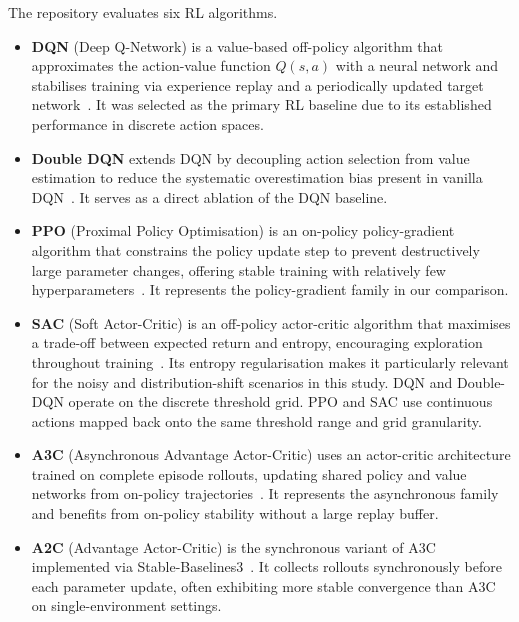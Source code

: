 \documentclass[12pt,a4paper]{article}
\begin{document}
The repository evaluates six RL algorithms.
\begin{itemize}[leftmargin=*]
    \item \textbf{DQN} (Deep Q-Network) is a value-based off-policy algorithm that
          approximates the action-value function $Q(s, a)$ with a neural network and
          stabilises training via experience replay and a periodically updated target
          network~\cite{mnih2015dqn}. It was selected as the primary RL baseline due
          to its established performance in discrete action spaces.

    \item \textbf{Double DQN} extends DQN by decoupling action selection from value
          estimation to reduce the systematic overestimation bias present in vanilla
          DQN~\cite{van2016ddqn}. It serves as a direct ablation of the DQN baseline.

    \item \textbf{PPO} (Proximal Policy Optimisation) is an on-policy policy-gradient
          algorithm that constrains the policy update step to prevent destructively
          large parameter changes, offering stable training with relatively few
          hyperparameters~\cite{schulman2017ppo}. It represents the policy-gradient
          family in our comparison.

    \item \textbf{SAC} (Soft Actor-Critic) is an off-policy actor-critic algorithm that
          maximises a trade-off between expected return and entropy, encouraging
          exploration throughout training~\cite{haarnoja2018sac}. Its entropy
          regularisation makes it particularly relevant for the noisy and
          distribution-shift scenarios in this study. DQN and Double-DQN operate on
          the discrete threshold grid. PPO and SAC use continuous actions mapped back
          onto the same threshold range and grid granularity.

    \item \textbf{A3C} (Asynchronous Advantage Actor-Critic) uses an actor-critic
          architecture trained on complete episode rollouts, updating shared policy and
          value networks from on-policy trajectories~\cite{mnih2016a3c}. It represents
          the asynchronous family and benefits from on-policy stability without a large
          replay buffer.

    \item \textbf{A2C} (Advantage Actor-Critic) is the synchronous variant of A3C
          implemented via Stable-Baselines3~\cite{stable_baselines3}. It collects rollouts
          synchronously before each parameter update, often exhibiting more stable
          convergence than A3C on single-environment settings.
\end{itemize}
\end{document}
